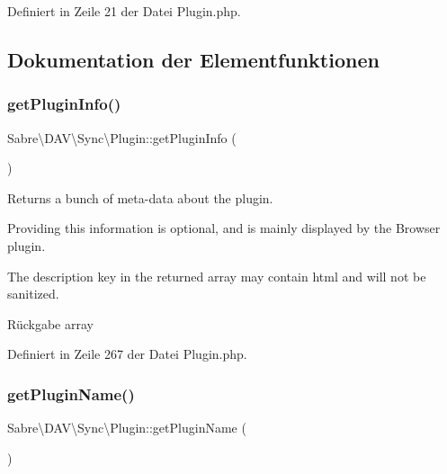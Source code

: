 Definiert in Zeile 21 der Datei Plugin.\+php.



\subsection{Dokumentation der Elementfunktionen}
\mbox{\label{class_sabre_1_1_d_a_v_1_1_sync_1_1_plugin_ac768ec02a4303531cbcea3bb52ba0aaf}} 
\subsubsection{\texorpdfstring{get\+Plugin\+Info()}{getPluginInfo()}}
{\footnotesize\ttfamily Sabre\textbackslash{}\+D\+A\+V\textbackslash{}\+Sync\textbackslash{}\+Plugin\+::get\+Plugin\+Info (\begin{DoxyParamCaption}{ }\end{DoxyParamCaption})}

Returns a bunch of meta-\/data about the plugin.

Providing this information is optional, and is mainly displayed by the Browser plugin.

The description key in the returned array may contain html and will not be sanitized.

\begin{DoxyReturn}{Rückgabe}
array 
\end{DoxyReturn}


Definiert in Zeile 267 der Datei Plugin.\+php.

\mbox{\label{class_sabre_1_1_d_a_v_1_1_sync_1_1_plugin_ad56bbdc39a58af73eeb1d73e64228077}} 
\subsubsection{\texorpdfstring{get\+Plugin\+Name()}{getPluginName()}}
{\footnotesize\ttfamily Sabre\textbackslash{}\+D\+A\+V\textbackslash{}\+Sync\textbackslash{}\+Plugin\+::get\+Plugin\+Name (\begin{DoxyParamCaption}{ }\end{DoxyParamCaption})}

